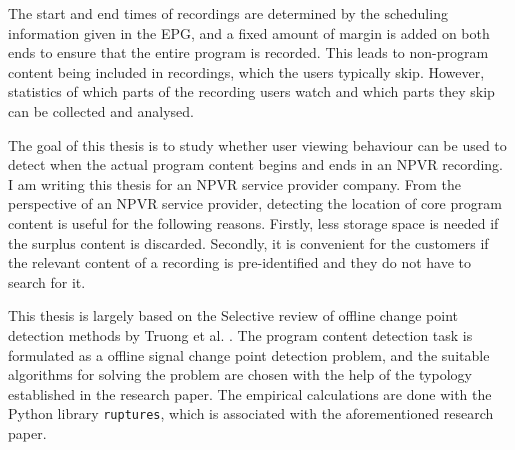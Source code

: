 The start and end times of recordings are determined by the scheduling information given in the EPG, and a fixed amount of margin is added on both ends to ensure that the entire program is recorded. %
This leads to non-program content being included in recordings, which the users typically skip. %
However, statistics of which parts of the recording users watch and which parts they skip can be collected and analysed. 

The goal of this thesis is to study whether user viewing behaviour can be used to %
detect when the actual program content begins and ends in an NPVR recording. I am writing this thesis for an NPVR service provider company. From the perspective of an NPVR service provider, detecting the location of core program content is useful for the following reasons. Firstly, less storage space is needed if the surplus content is discarded. Secondly, it is convenient for the customers if the relevant content of a recording is pre-identified and they do not have to search for it. %


This thesis is largely based on the Selective review of offline change point detection methods by Truong et al. \cite{truongSelectiveReviewOffline2020}.
The program content detection task is formulated as a offline signal change point detection problem, and the suitable algorithms for solving the problem are chosen with the help of the typology established in the research paper. The empirical calculations are done with the Python library \texttt{ruptures}, which is associated with the aforementioned research paper.

